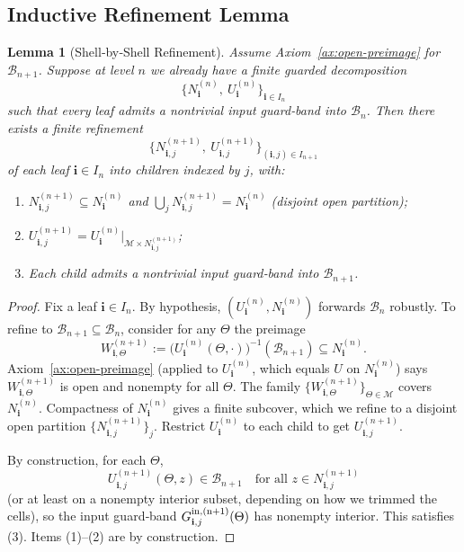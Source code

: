 \documentclass[12pt]{article}
\theoremstyle{definition}
\theoremstyle{plain}
\newtheorem{lemma}{Lemma}[section]
\begin{document}
\subsection{Inductive Refinement Lemma}
\label{subsec:inductive-lemma}

\begin{lemma}[Shell‑by‑Shell Refinement]
\label{lem:shell-refine}
Assume Axiom~\ref{ax:open-preimage} for $\mathcal B_{n+1}$.  
Suppose at level $n$ we already have a finite guarded decomposition
\[
  \{N^{(n)}_{\mathbf i},\ U^{(n)}_{\mathbf i}\}_{\mathbf i\in I_n}
\]
such that every leaf admits a nontrivial input guard‑band into $\mathcal B_n$.  Then there exists a finite refinement
\[
  \{N^{(n+1)}_{\mathbf i,j},\ U^{(n+1)}_{\mathbf i,j}\}_{(\mathbf i,j)\in I_{n+1}}
\]
of each leaf $\mathbf i\in I_n$ into children indexed by $j$, with:
\begin{enumerate}
  \item $N^{(n+1)}_{\mathbf i,j}\subseteq N^{(n)}_{\mathbf i}$ and $\bigcup_j N^{(n+1)}_{\mathbf i,j}=N^{(n)}_{\mathbf i}$ (disjoint open partition);
  \item $U^{(n+1)}_{\mathbf i,j}=U^{(n)}_{\mathbf i}\big|_{\mathcal M\times N^{(n+1)}_{\mathbf i,j}}$;
  \item Each child admits a nontrivial input guard‑band into $\mathcal B_{n+1}$.
\end{enumerate}
\end{lemma}

\begin{proof}
Fix a leaf $\mathbf i\in I_n$.  
By hypothesis, $(U^{(n)}_{\mathbf i},N^{(n)}_{\mathbf i})$ forwards $\mathcal B_n$ robustly.  
To refine to $\mathcal B_{n+1}\subseteq\mathcal B_n$, consider for any $\Theta$ the preimage
\[
  W_{\mathbf i,\Theta}^{(n+1)}
  := \bigl(U^{(n)}_{\mathbf i}(\Theta,\cdot)\bigr)^{-1}(\mathcal B_{n+1})
  \subseteq N^{(n)}_{\mathbf i}.
\]
Axiom~\ref{ax:open-preimage} (applied to $U^{(n)}_{\mathbf i}$, which equals $U$ on $N^{(n)}_{\mathbf i}$) says $W_{\mathbf i,\Theta}^{(n+1)}$ is open and nonempty for all $\Theta$. The family $\{W_{\mathbf i,\Theta}^{(n+1)}\}_{\Theta\in\mathcal M}$ covers $N^{(n)}_{\mathbf i}$. Compactness of $N^{(n)}_{\mathbf i}$ gives a finite subcover, which we refine to a disjoint open partition $\{N^{(n+1)}_{\mathbf i,j}\}_j$. Restrict $U^{(n)}_{\mathbf i}$ to each child to get $U^{(n+1)}_{\mathbf i,j}$.

By construction, for each $\Theta$, 
\[
  U^{(n+1)}_{\mathbf i,j}(\Theta,z)\in\mathcal B_{n+1}
  \quad\text{for all }z\in N^{(n+1)}_{\mathbf i,j}
\]
(or at least on a nonempty interior subset, depending on how we trimmed the cells), so the input guard‑band 
\(
  G^{\rm in,(n+1)}_{\mathbf i,j}(\Theta)
\)
has nonempty interior. This satisfies (3).  
Items (1)–(2) are by construction.  
\end{proof}
\end{document}
